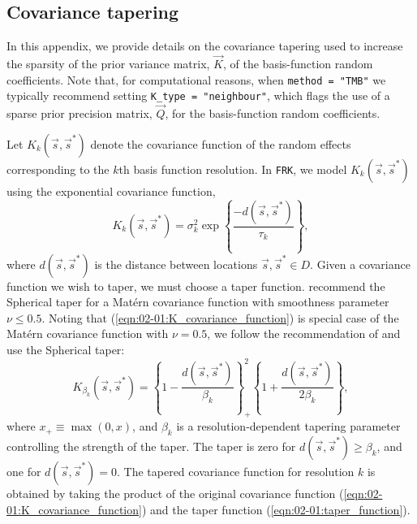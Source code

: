 \documentclass[12pt,a4paper]{article}
\begin{document}
\begin{appendices}
\section{Covariance tapering}
\label{Appendix:CovarianceTapering}

In this appendix, we provide details on the covariance tapering used to increase the sparsity of the prior variance matrix, $\vec{K}$, of the basis-function random coefficients. 
Note that, for computational reasons, when \texttt{method = "TMB"} we typically recommend setting \texttt{K\_type = "neighbour"}, which flags the use of a sparse prior precision matrix, $\vec{Q}$, for the basis-function random coefficients. 


Let $K_k(\vec{s}, \vec{s}^*)$ denote the covariance function of the random effects corresponding to the $k$th basis function resolution. 
 In \texttt{FRK}, we model $K_k(\vec{s}, \vec{s}^*)$ using the exponential covariance function,
\begin{equation}\label{eqn:02-01:K_covariance_function}
    K_k(\vec{s}, \vec{s}^*)  = \sigma^2_k \exp \left\{\frac{-d(\vec{s},\vec{s}^*)}{\tau_k}\right\}, 
\end{equation}
where $d(\vec{s},\vec{s}^*)$ is the distance between locations $\vec{s}, \vec{s}^* \in D$.  
 Given a covariance function we wish to taper, we must choose a taper function. 
 \citet{Furrer_2006_CovarianceTapering} recommend the Spherical taper for a Matérn covariance function with smoothness parameter $\nu\leq0.5$. 
 Noting that (\ref{eqn:02-01:K_covariance_function}) is special case of the Matérn covariance function with $\nu = 0.5$, we follow the recommendation of \cite{Furrer_2006_CovarianceTapering} and use the Spherical taper: 
\begin{equation}\label{eqn:02-01:taper_function}
K_{\beta_k}(\vec{s}, \vec{s}^*) 
=
\left\{1-\frac{d(\vec{s},\vec{s}^*)}{\beta_k}\right\}^2_{+}   \left\{1+\frac{d(\vec{s},\vec{s}^*)}{2\beta_k}\right\},
\end{equation}
where $x_{+} \equiv \max(0, x)$, and $\beta_k$ is a resolution-dependent tapering parameter controlling the strength of the taper. 
The taper is zero for $d(\vec{s},\vec{s}^*) \geq \beta_k$, and one for $d(\vec{s},\vec{s}^*) = 0$. 
The tapered covariance function for resolution $k$ is obtained by taking the product of the original covariance function (\ref{eqn:02-01:K_covariance_function}) and the taper function (\ref{eqn:02-01:taper_function}).%

\end{appendices}
\end{document}
